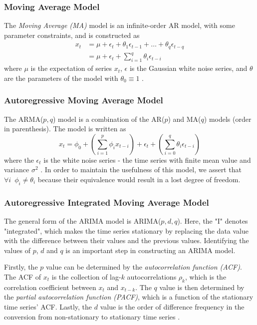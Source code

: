 \documentclass[conference]{IEEEtran}
\begin{document}
\subsubsection{Moving Average Model}
The \textit{Moving Average (MA)} model is an infinite-order AR model, with some parameter constraints, and is constructed as
\begin{align}
    x_t &= \mu + \epsilon_t + \theta_1\epsilon_{t-1} + \dots + \theta_q\epsilon_{t-q} \\
    &= \mu + \epsilon_t + \sum_{i=1}^q{\theta_i \epsilon_{t-i}}
\end{align}
where $\mu$ is the expectation of series $x_t$, $\epsilon$ is the Gaussian white noise series, and $\theta$ are the parameters of the model with $\theta_0 \equiv 1$ \cite{tsay}.

\subsubsection{Autoregressive Moving Average Model}
The ARMA($p, q$) model is a combination of the AR($p$) and MA($q$) models (order in parenthesis).
The model is written as
\begin{equation}
    x_t = \phi_0 + \left(\sum_{i=1}^p{\phi_i x_{t-i}}\right) + \epsilon_t + \left(\sum_{i=0}^q{\theta_i \epsilon_{t-i}}\right)
\end{equation}
where the $\epsilon_{t}$ is the white noise series - the time series with finite mean value and variance $\sigma^2$ \cite{tsay}.
In order to maintain the usefulness of this model, we assert that $\forall i \enspace \phi_i \ne \theta_i$ because their equivalence would result in a lost degree of freedom.

\subsubsection{Autoregressive Integrated Moving Average Model}
The general form of the ARIMA model is ARIMA($p, d, q$).
Here, the "I" denotes "integrated", which makes the time series stationary by replacing the data value with the difference between their values and the previous values.
Identifying the values of $p$, $d$ and $q$ is an important step in constructing an ARIMA model.

Firstly, the $p$ value can be determined by the \textit{autocorrelation function (ACF)}.
The ACF of $x_t$ is the collection of lag-$k$ autocorrelations $\rho_k$, which is the correlation coefficient between $x_t$ and $x_{t-k}$.
The $q$ value is then determined by the \textit{partial autocorrelation function (PACF)}, which is a function of the stationary time series' ACF.
Lastly, the $d$ value is the order of difference frequency in the conversion from non-stationary to stationary time series \cite{tsay}.
\end{document}
